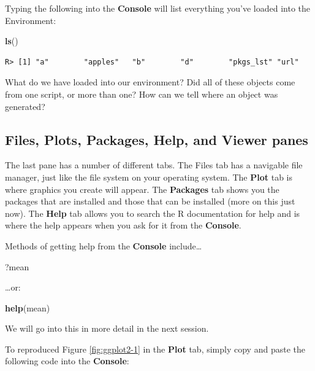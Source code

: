 \documentclass[]{book}
\newenvironment{Shaded}{\begin{snugshade}}{\end{snugshade}}
\newcommand{\KeywordTok}[1]{\textcolor[rgb]{0.13,0.29,0.53}{\textbf{#1}}}
\newcommand{\NormalTok}[1]{#1}
\theoremstyle{definition}
\theoremstyle{definition}
\theoremstyle{definition}
\theoremstyle{remark}
\begin{document}
Typing the following into the \textbf{Console} will list everything
you've loaded into the Environment:

\begin{Shaded}
\begin{Highlighting}[]
\KeywordTok{ls}\NormalTok{()}
\end{Highlighting}
\end{Shaded}

\begin{verbatim}
R> [1] "a"        "apples"   "b"        "d"        "pkgs_lst" "url"
\end{verbatim}

What do we have loaded into our environment? Did all of these objects
come from one script, or more than one? How can we tell where an object
was generated?

\subsection{Files, Plots, Packages, Help, and Viewer
panes}\label{files-plots-packages-help-and-viewer-panes}

The last pane has a number of different tabs. The Files tab has a
navigable file manager, just like the file system on your operating
system. The \textbf{Plot} tab is where graphics you create will appear.
The \textbf{Packages} tab shows you the packages that are installed and
those that can be installed (more on this just now). The \textbf{Help}
tab allows you to search the R documentation for help and is where the
help appears when you ask for it from the \textbf{Console}.

Methods of getting help from the \textbf{Console} include\ldots{}

\begin{Shaded}
\begin{Highlighting}[]
\NormalTok{?mean}
\end{Highlighting}
\end{Shaded}

\ldots{}or:

\begin{Shaded}
\begin{Highlighting}[]
\KeywordTok{help}\NormalTok{(mean)}
\end{Highlighting}
\end{Shaded}

We will go into this in more detail in the next session.

To reproduced Figure \ref{fig:ggplot2-1} in the \textbf{Plot} tab,
simply copy and paste the following code into the \textbf{Console}:
\end{document}
